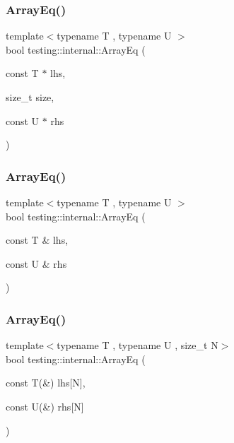 \subsubsection{\texorpdfstring{ArrayEq()}{ArrayEq()}\hspace{0.1cm}{\footnotesize\ttfamily [1/3]}}
{\footnotesize\ttfamily template$<$typename T , typename U $>$ \\
bool testing\+::internal\+::\+Array\+Eq (\begin{DoxyParamCaption}\item[{const T $\ast$}]{lhs,  }\item[{size\+\_\+t}]{size,  }\item[{const U $\ast$}]{rhs }\end{DoxyParamCaption})}

\mbox{\label{namespacetesting_1_1internal_a49b4d0ee49c0f8c93bab29ebd20630cc}} 
\subsubsection{\texorpdfstring{ArrayEq()}{ArrayEq()}\hspace{0.1cm}{\footnotesize\ttfamily [2/3]}}
{\footnotesize\ttfamily template$<$typename T , typename U $>$ \\
bool testing\+::internal\+::\+Array\+Eq (\begin{DoxyParamCaption}\item[{const T \&}]{lhs,  }\item[{const U \&}]{rhs }\end{DoxyParamCaption})\hspace{0.3cm}{\ttfamily [inline]}}

\mbox{\label{namespacetesting_1_1internal_a5cb6f81ee827130024261121c742b26c}} 
\subsubsection{\texorpdfstring{ArrayEq()}{ArrayEq()}\hspace{0.1cm}{\footnotesize\ttfamily [3/3]}}
{\footnotesize\ttfamily template$<$typename T , typename U , size\+\_\+t N$>$ \\
bool testing\+::internal\+::\+Array\+Eq (\begin{DoxyParamCaption}\item[{const T(\&)}]{lhs\mbox{[}\+N\mbox{]},  }\item[{const U(\&)}]{rhs\mbox{[}\+N\mbox{]} }\end{DoxyParamCaption})\hspace{0.3cm}{\ttfamily [inline]}}

